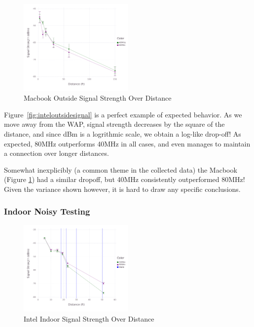 \begin{figure}[!h]
\centering
\includegraphics[width=0.5\textwidth]{figures/Mac_Outside_Beamformed}
\caption{Macbook Outside Signal Strength Over Distance}
\label{fig:macoutsidesignal}
\end{figure}


Figure~\ref{fig:inteloutsidesignal} is a perfect example of expected
behavior. As we move away from the WAP, signal strength decreases by
the square of the distance, and since dBm is a logrithmic scale, we
obtain a log-like drop-off! As expected, 80MHz outperforms 40MHz in
all cases, and even manages to maintain a connection over longer
distances.

Somewhat inexplicibly (a common theme in the collected data) the
Macbook (Figure \ref{fig:macoutsidesignal}) had a similar dropoff, but
40MHz consistently outperformed 80MHz! Given the variance shown
however, it is hard to draw any specific conclusions. 

\subsubsection{Indoor Noisy Testing}


\begin{figure}[!h]
\centering
\includegraphics[width=0.5\textwidth]{figures/Intel_Inside_Beamformed}
\caption{Intel Indoor Signal Strength Over Distance}
\label{fig:intelinsidesignal}
\end{figure}

